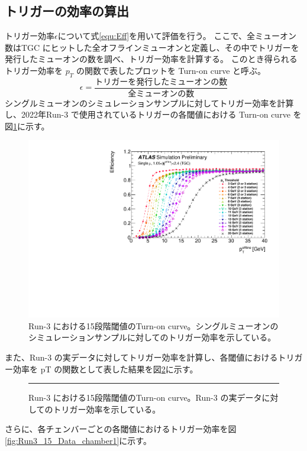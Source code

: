 \subsection{トリガーの効率の算出}
トリガー効率$\epsilon$について式\ref{equ:Eff}を用いて評価を行う。
ここで、全ミューオン数はTGC にヒットした全オフラインミューオンと定義し、その中でトリガーを発行したミューオンの数を調べ、トリガー効率を計算する。
このとき得られるトリガー効率を $p_T$ の関数で表したプロットを Turn-on curve と呼ぶ。
\begin{equation}
　\epsilon=\frac{トリガーを発行したミューオンの数}{全ミューオンの数}
　\label{equ:Eff}
\end{equation}
シングルミューオンのシミュレーションサンプルに対してトリガー効率を計算し、2022年Run-3 で使用されているトリガーの各閾値における Turn-on curve を図\ref{fig:Run3_15_MC}に示す。
\begin{figure}[tb]
  \centering
  \includegraphics[clip, width=15cm]{fig/3/PLOT-TRIG-2020-01-fig1.pdf}
  \caption{Run-3 における15段階閾値のTurn-on curve。シングルミューオンのシミュレーションサンプルに対してのトリガー効率を示している。}
  \label{fig:Run3_15_MC}
\end{figure}
また、Run-3 の実データに対してトリガー効率を計算し、各閾値におけるトリガー効率を pT の関数として表した結果を図\ref{fig:Run3_15_Data}に示す。
\begin{figure}[tb]
  \centering
  \rule{8cm}{6cm}
  \caption{Run-3 における15段階閾値のTurn-on curve。Run-3 の実データに対してのトリガー効率を示している。}
  \label{fig:Run3_15_Data}
\end{figure}
さらに、各チェンバーごとの各閾値におけるトリガー効率を図\ref{fig:Run3_15_Data_chamber1}に示す。

